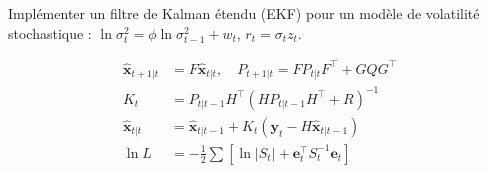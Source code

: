 \begin{exercice}
Impl\'ementer un filtre de Kalman \'etendu (EKF) pour un mod\`ele de volatilit\'e stochastique : $\ln\sigma_t^2 = \phi\ln\sigma_{t-1}^2+w_t$, $r_t=\sigma_t z_t$.
\end{exercice}

\begin{formules}
\begin{align*}
\hat{\bm{x}}_{t+1|t} &= F\hat{\bm{x}}_{t|t}, \quad P_{t+1|t}=FP_{t|t}F^\top+GQG^\top \\
K_t &= P_{t|t-1}H^\top(HP_{t|t-1}H^\top+R)^{-1} \\
\hat{\bm{x}}_{t|t} &= \hat{\bm{x}}_{t|t-1}+K_t(\bm{y}_t-H\hat{\bm{x}}_{t|t-1}) \\
\ln L &= -\tfrac{1}{2}\sum[\ln|S_t|+\bm{e}_t^\top S_t^{-1}\bm{e}_t]
\end{align*}
\end{formules}
